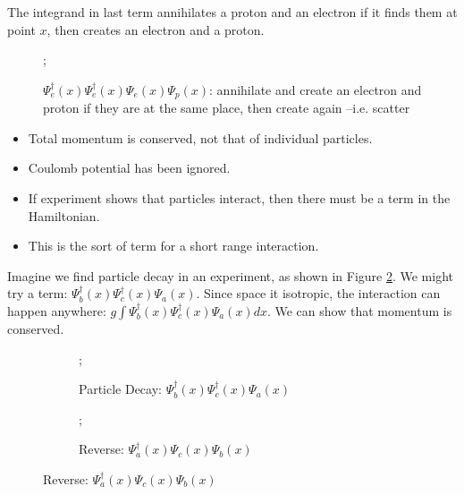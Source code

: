 \documentclass[]{article}
\begin{document}
The integrand in last term annihilates a proton and an electron if it finds them at point $x$, then creates an electron and a proton.

\begin{figure}[H]
	\begin{center}
		\caption[$\Psi^\dagger_e(x) \Psi^\dagger_e(x) \Psi_e(x) \Psi_p(x)$--scattering]{$\Psi^\dagger_e(x) \Psi^\dagger_e(x) \Psi_e(x) \Psi_p(x)$: annihilate and create an electron and proton if they are at the same place, then create again --i.e. scatter}\label{fig:scatter:e:p}
		;
	\end{center}
\end{figure}

\begin{itemize}
	\item Total momentum is conserved, not that of individual particles.
	\item Coulomb potential has been ignored.
	\item If experiment shows that particles interact, then there must be a term in the Hamiltonian.
	\item This is the sort of term for a short range interaction.
\end{itemize}

Imagine we find particle decay in an experiment, as shown in Figure \ref{fig:particle:decay}. We might try a term: $\Psi^\dagger_b(x) \Psi^\dagger_c(x) \Psi_a(x)$. Since space it isotropic, the interaction can happen anywhere: $g \int \Psi^\dagger_b(x) \Psi^\dagger_c(x) \Psi_a(x) dx$. We can show that momentum is conserved.

\begin{figure}[H]
	\caption{$\Psi^\dagger_b(x) \Psi^\dagger_c(x) \Psi_a(x) dx +  \Psi^\dagger_a(x) \Psi_c(x) \Psi_b(x)$}\label{fig:particle:decay:and:reverse}
	\begin{subfigure}{0.45\textwidth}
		\caption{Particle Decay: $\Psi^\dagger_b(x) \Psi^\dagger_c(x) \Psi_a(x)$}\label{fig:particle:decay}
		;
	\end{subfigure}
	\begin{subfigure}{0.45\textwidth}
		\caption{Reverse: $\Psi^\dagger_a(x) \Psi_c(x) \Psi_b(x)$}\label{fig:particle:decay:reverse}
		;
	\end{subfigure}
\end{figure}
\end{document}
